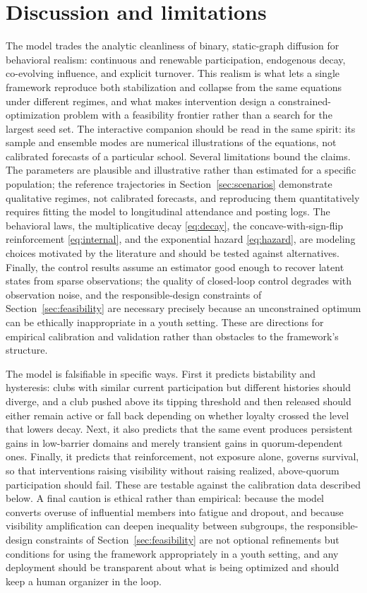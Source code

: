 \documentclass[11pt]{article}
\begin{document}
\section{Discussion and limitations}\label{sec:discussion}
The model trades the analytic cleanliness of binary, static-graph diffusion for behavioral realism: continuous and renewable participation, endogenous decay, co-evolving influence, and explicit turnover. This realism is what lets a single framework reproduce both stabilization and collapse from the same equations under different regimes, and what makes intervention design a constrained-optimization problem with a feasibility frontier rather than a search for the largest seed set. The interactive companion should be read in the same spirit: its sample and ensemble modes are numerical illustrations of the equations, not calibrated forecasts of a particular school. Several limitations bound the claims. The parameters are plausible and illustrative rather than estimated for a specific population; the reference trajectories in Section~\ref{sec:scenarios} demonstrate qualitative regimes, not calibrated forecasts, and reproducing them quantitatively requires fitting the model to longitudinal attendance and posting logs. The behavioral laws, the multiplicative decay \eqref{eq:decay}, the concave-with-sign-flip reinforcement \eqref{eq:internal}, and the exponential hazard \eqref{eq:hazard}, are modeling choices motivated by the literature and should be tested against alternatives. Finally, the control results assume an estimator good enough to recover latent states from sparse observations; the quality of closed-loop control degrades with observation noise, and the responsible-design constraints of Section~\ref{sec:feasibility} are necessary precisely because an unconstrained optimum can be ethically inappropriate in a youth setting. These are directions for empirical calibration and validation rather than obstacles to the framework's structure.

The model is falsifiable in specific ways. First it predicts bistability and hysteresis: clubs with similar current participation but different histories should diverge, and a club pushed above its tipping threshold and then released should either remain active or fall back depending on whether loyalty crossed the level that lowers decay. Next, it also predicts that the same event produces persistent gains in low-barrier domains and merely transient gains in quorum-dependent ones. Finally, it predicts that reinforcement, not exposure alone, governs survival, so that interventions raising visibility without raising realized, above-quorum participation should fail. These are testable against the calibration data described below. A final caution is ethical rather than empirical: because the model converts overuse of influential members into fatigue and dropout, and because visibility amplification can deepen inequality between subgroups, the responsible-design constraints of Section~\ref{sec:feasibility} are not optional refinements but conditions for using the framework appropriately in a youth setting, and any deployment should be transparent about what is being optimized and should keep a human organizer in the loop.
\end{document}
